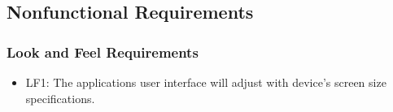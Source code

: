 \documentclass[]{article}
\begin{document}

	
\subsection{Nonfunctional Requirements}
\subsubsection{Look and Feel Requirements}
\begin{itemize}
	\item LF1: The applications user interface will adjust with device’s screen size specifications.
\end{itemize}
\end{document}
